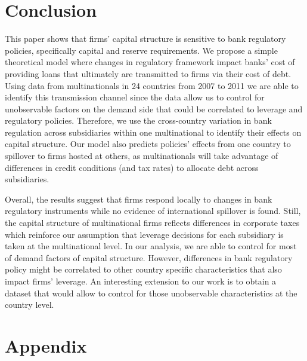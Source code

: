 \documentclass[12pt]{article}
\begin{document}
	\section{Conclusion} \label{sec:conclusion}
		
	This paper shows that firms' capital structure is sensitive to bank regulatory policies, specifically capital and reserve requirements. We propose a simple theoretical model where changes in regulatory framework impact banks' cost of providing loans that ultimately are transmitted to firms via their cost of debt. Using data from multinationals in 24 countries from 2007 to 2011 we are able to identify this transmission channel since the data allow us to control for unobservable factors on the demand side that could be correlated to leverage and regulatory policies. Therefore, we use the cross-country variation in bank regulation across subsidiaries within one multinational to identify their effects on capital structure. Our model also predicts policies' effects from one country to spillover to firms hosted at others, as multinationals will take advantage of differences in credit conditions (and tax rates) to allocate debt across subsidiaries. 
	
	Overall, the results suggest that firms respond locally to changes in bank regulatory instruments while no evidence of international spillover is found. Still, the capital structure of multinational firms reflects differences in corporate taxes which reinforce our assumption that leverage decisions for each subsidiary is taken at the multinational level. In our analysis, we are able to control for most of demand factors of capital structure. However, differences in bank regulatory policy might be correlated to other country specific characteristics that also impact firms' leverage. An interesting extension to our work is to obtain a dataset that would allow to control for those unobservable characteristics at the country level.

		
\singlespacing


	
	
	
%	
	
	

	
\section*{Appendix } 
\label{sec:appendixa}
	
\end{document}
